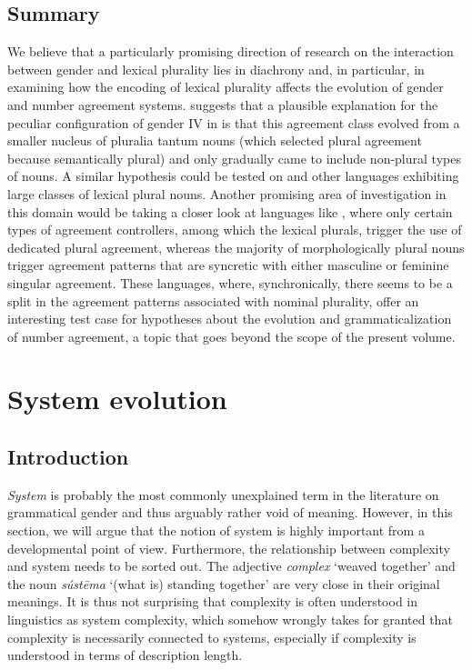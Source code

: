 \documentclass[output=collectionpaper]{langsci/langscibook}
\begin{document}
  \subsection{Summary}
We believe that a particularly promising direction of research on the interaction between gender and lexical plurality lies in diachrony and, in particular, in examining how the encoding of lexical plurality affects the evolution of gender and number agreement systems.  suggests that a plausible explanation for the peculiar configuration of gender IV in  is that this agreement class evolved from a smaller nucleus of pluralia tantum nouns (which selected plural agreement because semantically plural) and only gradually came to include non-plural types of nouns. A similar hypothesis could be tested on  and other  languages exhibiting large classes of lexical plural nouns. Another promising area of investigation in this domain would be taking a closer look at languages like , where only certain types of agreement controllers, among which the lexical plurals, trigger the use of dedicated plural agreement, whereas the majority of morphologically plural nouns trigger agreement patterns that are syncretic with either masculine or feminine singular agreement. These languages, where, synchronically, there seems to be a split in the agreement patterns associated with nominal plurality, offer an interesting test case for hypotheses about the evolution and grammaticalization of number agreement, a topic that goes beyond the scope of the present volume.


\section{System evolution}
\label{sec:WDG:10}

  \subsection{Introduction}

\textit{System} is probably the most commonly unexplained term in the literature on grammatical gender and thus arguably rather void of meaning. However, in this section, we will argue that the notion of system is highly important from a developmental point of view. Furthermore, the relationship between complexity and system needs to be sorted out. The  adjective \textit{complex} `weaved together' and the  noun \textit{sústēma} `(what is) standing together' are very close in their original meanings. It is thus not surprising that complexity is often understood in linguistics as system complexity, which somehow wrongly takes for granted that complexity is necessarily connected to systems, especially if complexity is understood in terms of description length.
\end{document}
